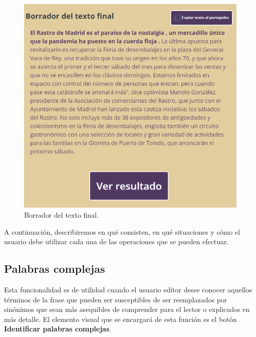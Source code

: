 \begin{figure}[h!]
	\centering
	\includegraphics[scale=1.0]{Imagenes/Figuras/borradorTextoFinal}
	\caption{Borrador del texto final.}
	\label{fig:borradorTextoFinal}
\end{figure}


A continuación, describiremos en qué consisten, en qué situaciones y cómo el usuario debe utilizar cada una de las operaciones que se pueden efectuar.

\subsection{Palabras complejas}
Esta funcionalidad es de utilidad cuando el usuario editor desee conocer aquellos términos de la frase que pueden ser susceptibles de ser reemplazados por sinónimos que sean más asequibles de comprender para el lector o explicados en más detalle. El elemento visual que se encargará de esta función es el botón \textbf{Identificar palabras complejas}.

